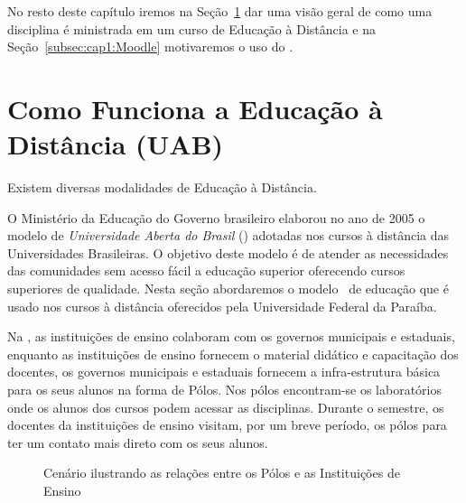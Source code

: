 No resto deste cap{\' i}tulo iremos na Se{\c c}{\~ a}o~\ref{subsec:cap1:Ead} dar uma vis{\~ a}o geral de como uma disciplina
{\'e} ministrada em um curso de Educa{\c c}{\~ a}o {\`a} Dist{\^ a}ncia e na Se{\c c}{\~ a}o~\ref{subsec:cap1:Moodle} motivaremos o
uso do \moodle.

\section{Como Funciona a Educa{\c c}{\~ a}o {\`a} Dist{\^ a}ncia (UAB)}
\label{subsec:cap1:Ead}

Existem diversas modalidades de Educa{\c c}{\~ a}o {\`a} Dist{\^ a}ncia.  

O Minist{\'e}rio da Educa{\c c}{\~ a}o do Governo brasileiro elaborou no ano de 2005 o modelo de 
\emph{Universidade Aberta do Brasil} (\uab) adotadas nos cursos {\`a} dist{\^ a}ncia das 
Universidades Brasileiras. O objetivo deste modelo {\'e} de atender as necessidades 
das comunidades sem acesso f{\' a}cil a educa{\c c}{\~ a}o superior oferecendo cursos superiores de qualidade.
Nesta se{\c c}{\~ a}o abordaremos o modelo \uab\ de educa{\c c}{\~ a}o que {\'e} usado nos cursos {\`a} dist{\^ a}ncia oferecidos pela
Universidade Federal da Para{\' i}ba.

Na \uab, as institui{\c c}{\~ o}es de ensino colaboram com os governos municipais e 
estaduais, enquanto as institui{\c c}{\~ o}es de ensino fornecem o material did{\' a}tico e capacita{\c c}{\~ a}o 
dos docentes, os governos municipais e estaduais fornecem a infra-estrutura b{\' a}sica 
para os seus alunos na forma de P\'olos. Nos p\'olos encontram-se os laborat\'orios onde
os alunos dos cursos podem acessar as disciplinas. Durante o semestre, os docentes
da institui{\c c}{\~ o}es de ensino visitam, por um breve per{\' i}odo, os p\'olos para ter um contato mais direto com os 
seus alunos. 
\begin{figure}[htbp]
 \begin{center}
  \caption{Cen{\' a}rio ilustrando as rela{\c c}{\~ o}es entre os P\'olos e as Institui{\c c}{\~ o}es de Ensino}
  \label{fig:UAB}
 \end{center}
\end{figure}

